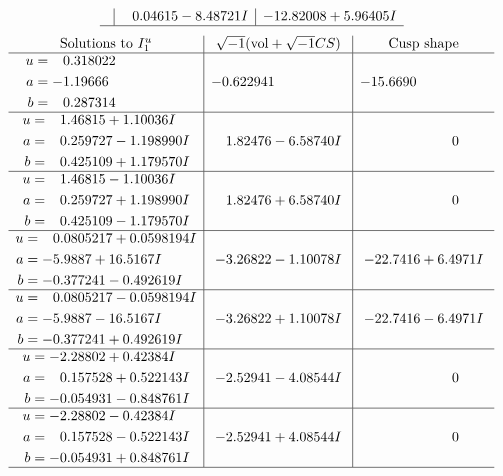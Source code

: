 \documentclass[1p]{elsarticle_modified}
\theoremstyle{definition}
\newcommand{\I}{\sqrt{-1}}
\begin{document}
$$\begin{array}{c|c|c}
 & \phantom{-}0.04615 - 8.48721 I & -12.82008 + 5.96405 I\\
 \hline 
 \end{array}$$\newpage$$\begin{array}{c|c|c}  
\text{Solutions to }I^u_{1}& \I (\text{vol} + \sqrt{-1}CS) & \text{Cusp shape}\\
 \hline 
\begin{aligned}
u &= \phantom{-}0.318022\phantom{ +0.000000I} \\
a &= -1.19666\phantom{ +0.000000I} \\
b &= \phantom{-}0.287314\phantom{ +0.000000I}\end{aligned}
 & -0.622941\phantom{ +0.000000I} & -15.6690\phantom{ +0.000000I} \\ \hline\begin{aligned}
u &= \phantom{-}1.46815 + 1.10036 I \\
a &= \phantom{-}0.259727 - 1.198990 I \\
b &= \phantom{-}0.425109 + 1.179570 I\end{aligned}
 & \phantom{-}1.82476 - 6.58740 I & \phantom{-0.000000 } 0 \\ \hline\begin{aligned}
u &= \phantom{-}1.46815 - 1.10036 I \\
a &= \phantom{-}0.259727 + 1.198990 I \\
b &= \phantom{-}0.425109 - 1.179570 I\end{aligned}
 & \phantom{-}1.82476 + 6.58740 I & \phantom{-0.000000 } 0 \\ \hline\begin{aligned}
u &= \phantom{-}0.0805217 + 0.0598194 I \\
a &= -5.9887 + 16.5167 I \\
b &= -0.377241 - 0.492619 I\end{aligned}
 & -3.26822 - 1.10078 I & -22.7416 + 6.4971 I \\ \hline\begin{aligned}
u &= \phantom{-}0.0805217 - 0.0598194 I \\
a &= -5.9887 - 16.5167 I \\
b &= -0.377241 + 0.492619 I\end{aligned}
 & -3.26822 + 1.10078 I & -22.7416 - 6.4971 I \\ \hline\begin{aligned}
u &= -2.28802 + 0.42384 I \\
a &= \phantom{-}0.157528 + 0.522143 I \\
b &= -0.054931 - 0.848761 I\end{aligned}
 & -2.52941 - 4.08544 I & \phantom{-0.000000 } 0 \\ \hline\begin{aligned}
u &= -2.28802 - 0.42384 I \\
a &= \phantom{-}0.157528 - 0.522143 I \\
b &= -0.054931 + 0.848761 I\end{aligned}
 & -2.52941 + 4.08544 I & \phantom{-0.000000 } 0\\
 \hline 
 \end{array}$$\newpage\newpage\renewcommand{\arraystretch}{1}
\end{document}

